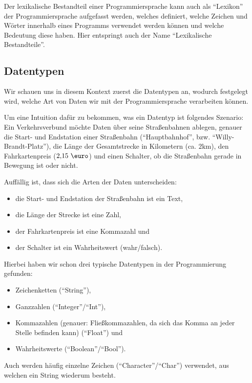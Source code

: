 
Der lexikalische Bestandteil einer Programmiersprache kann auch als \enquote{Lexikon} der Programmiersprache aufgefasst werden, welches definiert, welche Zeichen und Wörter innerhalb eines Programms verwendet werden können und welche Bedeutung diese haben. Hier entspringt auch der Name \enquote{Lexikalische Bestandteile}.

\subsection{Datentypen} \functionalMark \imperativeMark \oopMark

	Wir schauen uns in diesem Kontext zuerst die Datentypen an, wodurch festgelegt wird, welche Art von Daten wir mit der Programmiersprache verarbeiten können.
	
	Um eine Intuition dafür zu bekommen, was ein Datentyp ist folgendes Szenario:
	Ein Verkehrsverbund möchte Daten über seine Straßenbahnen ablegen, genauer die Start- und Endstation einer Straßenbahn (\enquote{Hauptbahnhof}, bzw. \enquote{Willy-Brandt-Platz}), die Länge der Gesamtstrecke in Kilometern (ca. $ 2\text{km} $), den Fahrkartenpreis ($ 2,\!15\text{ \euro} $) und einen Schalter, ob die Straßenbahn gerade in Bewegung ist oder nicht.
	
	Auffällig ist, dass sich die Arten der Daten unterscheiden:
	\begin{itemize}
		\item die Start- und Endstation der Straßenbahn ist ein Text,
		\item die Länge der Strecke ist eine Zahl,
		\item der Fahrkartenpreis ist eine Kommazahl und
		\item der Schalter ist ein Wahrheitswert (wahr/falsch).
	\end{itemize}
	Hierbei haben wir schon drei typische Datentypen in der Programmierung gefunden:
	\begin{itemize}
		\item Zeichenketten (\enquote{String}),
		\item Ganzzahlen (\enquote{Integer}/\enquote{Int}),
		\item Kommazahlen (genauer: Fließkommazahlen, da sich das Komma an jeder Stelle befinden kann) (\enquote{Float}) und
		\item Wahrheitswerte (\enquote{Boolean}/\enquote{Bool}).
	\end{itemize}
	Auch werden häufig einzelne Zeichen (\enquote{Character}/\enquote{Char}) verwendet, aus welchen ein String wiederum besteht.
	
